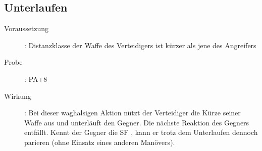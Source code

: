 \subsection{Unterlaufen}
\label{reaktion.unterlaufen}
\begin{description}
    \item[Voraussetzung]:
        Distanzklasse der Waffe des Verteidigers ist kürzer als jene des Angreifers
    \item[Probe]:
        PA+8
    \item[Wirkung]:
        Bei dieser waghalsigen Aktion nützt der Verteidiger die Kürze seiner Waffe aus und unterläuft den Gegner.
        Die nächste Reaktion des Gegners entfällt.
        Kennt der Gegner die SF , kann er trotz dem Unterlaufen dennoch parieren (ohne Einsatz eines anderen Manövers).
\end{description}
